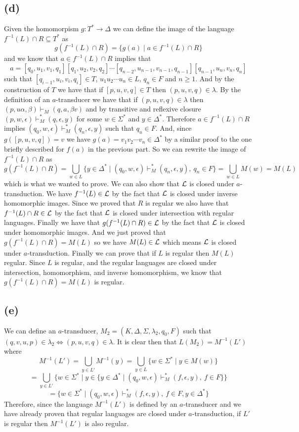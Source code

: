 \documentclass[12pt]{article}
\begin{document}
\subsection*{(d)}
Given the homomorpism $g : T^* \rightarrow \Delta$ we can define the image of
the language $f^{-1}(L)\cap R\subseteq T^*$ as
$$g(f^{-1}(L)\cap R) = \{g(a) \mid a \in f^{-1}(L)\cap R\}$$
and we know that $a \in f^{-1}(L)\cap R$ implies that $$a =
[q_0, u_1, v_1, q_1][q_1, u_2, v_2, q_2]\cdots
[q_{n-2}, u_{n-1}, v_{n-1}, q_{n-1}][q_{n-1}, u_n, v_n, q_n]$$ such that
$[q_{i-1}, u_i, v_i, q_i]\in T$, $u_1u_2\cdots u_n\in L$, $q_n\in F$ and
$n\geq 1$. And by the construction of $T$ we have that if $[p,u,v,q] \in T$
then $(p,u,v,q) \in \lambda$. By the definition of an $a$-transducer we have
that if $(p,u,v,q) \in \lambda$ then $(p, u\alpha, \beta) \vdash_M (q,a,\beta v)$
and by transitive and reflexive closure
$(p,w, \epsilon) \vdash_M^* (q,\epsilon,y)$ for some $w \in \Sigma^*$ and
$y \in \Delta^*$. Therefore $a \in f^{-1}(L)\cap R$ implies
$(q_0,w,\epsilon) \vdash_M^* (q_n, \epsilon, y)$ such that $q_n \in F$.
And, since $g([p,u,v,q]) = v$ we have $g(a) = v_1v_2\cdots v_n \in \Delta^*$ by
a similar proof to the one briefly described for $f(a)$ in the previous part.
So we can rewrite the image of $f^{-1}(L)\cap R$ as
$$g(f^{-1}(L)\cap R) = \bigcup _{w\in L} \{y \in \Delta^*
\mid (q_0, w, \epsilon) \vdash_M^* (q_n, \epsilon, y),\ q_n \in F\} =
\bigcup _{w\in L} M(w) = M(L)$$
which is what we wanted to prove. We can also show that ${\cal L}$ is closed under
$a$-transduction. We have $f^{-1}(L) \in {\cal L}$ by the fact that ${\cal L}$ is
closed under inverse homomorphic images. Since we proved that $R$ is regular we
also have that $f^{-1}(L) \cap R \in {\cal L}$ by the fact that ${\cal L}$ is closed
under intersection with regular languages. Finally we have that
$g(f^{-1}(L) \cap R) \in {\cal L}$ by the fact that ${\cal L}$ is closed under
homomorphic images. And we just proved that $g(f^{-1}(L) \cap R) = M(L)$ so we
have $M(L) \in {\cal L}$ which means ${\cal L}$ is closed under $a$-transduction.
Finally we can prove that if $L$ is regular then $M(L)$ regular. Since $L$ is
regular, and the regular languages are closed under intersection, homomorphism,
and inverse homomorphism, we know that $g(f^{-1}(L) \cap R) = M(L)$ is regular.

\subsection*{(e)}
We can define an $a$-transducer, $M_2 = (K, \Delta,\Sigma,\lambda_2,q_0, F)$
such that $(q,v,u,p) \in \lambda_2 \iff (p,u,v,q) \in \lambda$. It is clear then
that $L(M_2) = M^{-1}(L')$ where
$$M^{-1}(L') = \bigcup _{y\in L'} M^{-1}(y)
= \bigcup _{y\in L} \{w \in \Sigma^* \mid y \in M(w)\}$$
$$ = \bigcup _{y\in L'} \{w \in \Sigma^*
\mid y \in \{y \in \Delta^*
\mid (q_0, w, \epsilon) \vdash_M^* (f, \epsilon, y),\ f \in F\}\}$$
$$= \{w \in \Sigma^* \mid (q_0, w, \epsilon) \vdash_M^* (f, \epsilon, y)
,\ f\in F, y\in \Delta^*\}$$
Therefore, since the language $M^{-1}(L')$
is defined by an $a$-transducer and we have already proven that regular languages
are closed under $a$-transduction, if $L'$ is regular then $M^{-1}(L')$ is also
regular.
\end{document}
